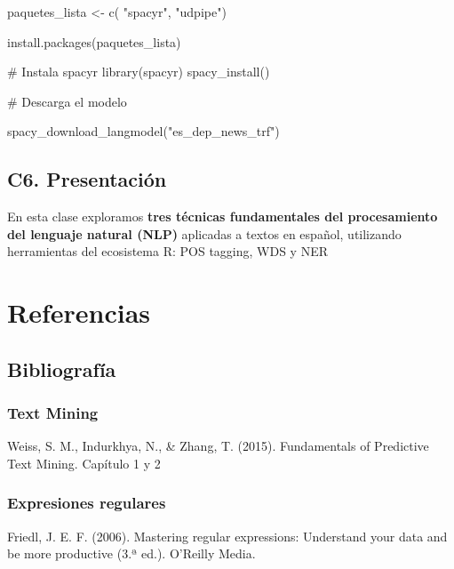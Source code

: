 \documentclass[
  letterpaper,
  DIV=11,
  numbers=noendperiod]{scrreprt}
\newenvironment{Shaded}{\begin{snugshade}}{\end{snugshade}}
\newcommand{\CommentTok}[1]{\textcolor[rgb]{0.37,0.37,0.37}{#1}}
\newcommand{\FunctionTok}[1]{\textcolor[rgb]{0.28,0.35,0.67}{#1}}
\newcommand{\NormalTok}[1]{\textcolor[rgb]{0.00,0.23,0.31}{#1}}
\newcommand{\OtherTok}[1]{\textcolor[rgb]{0.00,0.23,0.31}{#1}}
\newcommand{\StringTok}[1]{\textcolor[rgb]{0.13,0.47,0.30}{#1}}
\begin{document}
\begin{Shaded}
\begin{Highlighting}[]

\NormalTok{paquetes\_lista }\OtherTok{\textless{}{-}} \FunctionTok{c}\NormalTok{(}
  \StringTok{"spacyr"}\NormalTok{, }\StringTok{"udpipe"}\NormalTok{)}

\FunctionTok{install.packages}\NormalTok{(paquetes\_lista)}

\CommentTok{\# Instala spacyr}
\FunctionTok{library}\NormalTok{(spacyr)}
\FunctionTok{spacy\_install}\NormalTok{()}

\CommentTok{\# Descarga el modelo}

\FunctionTok{spacy\_download\_langmodel}\NormalTok{(}\StringTok{"es\_dep\_news\_trf"}\NormalTok{)}
\end{Highlighting}
\end{Shaded}

\chapter{C6. Presentación}\label{c6.-presentaciuxf3n-1}

En esta clase exploramos \textbf{tres técnicas fundamentales del
procesamiento del lenguaje natural (NLP)} aplicadas a textos en español,
utilizando herramientas del ecosistema R: POS tagging, WDS y NER

\part{\textbf{Referencias}}

\chapter{Bibliografía}\label{bibliografuxeda}

\section{Text Mining}\label{text-mining}

Weiss, S. M., Indurkhya, N., \& Zhang, T. (2015). Fundamentals of
Predictive Text Mining. Capítulo 1 y 2

\section{Expresiones regulares}\label{expresiones-regulares}

Friedl, J. E. F. (2006). Mastering regular expressions: Understand your
data and be more productive (3.ª ed.). O'Reilly Media.
\end{document}
